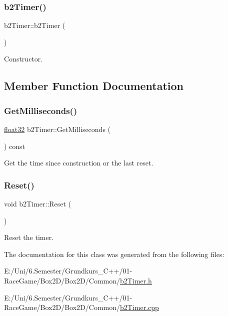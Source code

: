 \subsubsection{\texorpdfstring{b2Timer()}{b2Timer()}}
{\footnotesize\ttfamily b2\+Timer\+::b2\+Timer (\begin{DoxyParamCaption}{ }\end{DoxyParamCaption})}



Constructor. 



\subsection{Member Function Documentation}
\mbox{\label{classb2_timer_a15fd1aaa83a9d58cc004c852df71abb3}} 
\subsubsection{\texorpdfstring{GetMilliseconds()}{GetMilliseconds()}}
{\footnotesize\ttfamily \mbox{\hyperlink{b2_settings_8h_aacdc525d6f7bddb3ae95d5c311bd06a1}{float32}} b2\+Timer\+::\+Get\+Milliseconds (\begin{DoxyParamCaption}{ }\end{DoxyParamCaption}) const}



Get the time since construction or the last reset. 

\mbox{\label{classb2_timer_a367388794588e9283600437be82f2889}} 
\subsubsection{\texorpdfstring{Reset()}{Reset()}}
{\footnotesize\ttfamily void b2\+Timer\+::\+Reset (\begin{DoxyParamCaption}{ }\end{DoxyParamCaption})}



Reset the timer. 



The documentation for this class was generated from the following files\+:\begin{DoxyCompactItemize}
\item 
E\+:/\+Uni/6.\+Semester/\+Grundkurs\+\_\+\+C++/01-\/\+Race\+Game/\+Box2\+D/\+Box2\+D/\+Common/\mbox{\hyperlink{b2_timer_8h}{b2\+Timer.\+h}}\item 
E\+:/\+Uni/6.\+Semester/\+Grundkurs\+\_\+\+C++/01-\/\+Race\+Game/\+Box2\+D/\+Box2\+D/\+Common/\mbox{\hyperlink{b2_timer_8cpp}{b2\+Timer.\+cpp}}\end{DoxyCompactItemize}

